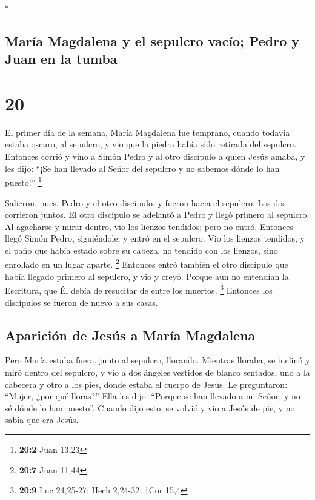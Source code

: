 \begin{paracol}{2}
\begin{otherlanguage}{english}
\end{otherlanguage}

\switchcolumn[0]*

\hypertarget{maruxeda-magdalena-y-el-sepulcro-vacuxedo-pedro-y-juan-en-la-tumba}{%
\subsection{María Magdalena y el sepulcro vacío; Pedro y Juan en la
tumba}\label{maruxeda-magdalena-y-el-sepulcro-vacuxedo-pedro-y-juan-en-la-tumba}}

\hypertarget{section-38}{%
\section{20}\label{section-38}}

 El primer día de la semana, María Magdalena fue temprano,
cuando todavía estaba oscuro, al sepulcro, y vio que la piedra había
sido retirada del sepulcro.  Entonces corrió y vino a
Simón Pedro y al otro discípulo a quien Jesús amaba, y les dijo: ``¡Se
han llevado al Señor del sepulcro y no sabemos dónde lo han puesto!''
\footnote{\textbf{20:2} Juan 13,23}

 Salieron, pues, Pedro y el otro discípulo, y fueron hacia
el sepulcro.  Los dos corrieron juntos. El otro discípulo
se adelantó a Pedro y llegó primero al sepulcro.  Al
agacharse y mirar dentro, vio los lienzos tendidos; pero no entró.
 Entonces llegó Simón Pedro, siguiéndole, y entró en el
sepulcro. Vio los lienzos tendidos,  y el paño que había
estado sobre su cabeza, no tendido con los lienzos, sino enrollado en un
lugar aparte. \footnote{\textbf{20:7} Juan 11,44} 
Entonces entró también el otro discípulo que había llegado primero al
sepulcro, y vio y creyó.  Porque aún no entendían la
Escritura, que Él debía de resucitar de entre los muertos. \footnote{\textbf{20:9}
  Luc 24,25-27; Hech 2,24-32; 1Cor 15,4}  Entonces los
discípulos se fueron de nuevo a sus casas.

\hypertarget{apariciuxf3n-de-jesuxfas-a-maruxeda-magdalena}{%
\subsection{Aparición de Jesús a María
Magdalena}\label{apariciuxf3n-de-jesuxfas-a-maruxeda-magdalena}}

 Pero María estaba fuera, junto al sepulcro, llorando.
Mientras lloraba, se inclinó y miró dentro del sepulcro, 
y vio a dos ángeles vestidos de blanco sentados, uno a la cabecera y
otro a los pies, donde estaba el cuerpo de Jesús.  Le
preguntaron: ``Mujer, ¿por qué lloras?'' Ella les dijo: ``Porque se han
llevado a mi Señor, y no sé dónde lo han puesto''. 
Cuando dijo esto, se volvió y vio a Jesús de pie, y no sabía que era
Jesús.


\end{paracol}
